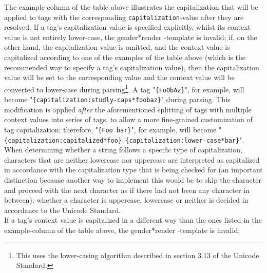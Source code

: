 \documentclass{article}
\newcommand{\GenderRender}{
    gender*render
}
\begin{document}
    The example-column of the table above illustrates the capitalization that will be applied to tags with the corresponding \texttt{capitalization}-value after they are resolved.
    If a tag's capitalization value is specified explicitly, whilst its context value is not entirely lower-case, the \GenderRender-template is invalid;
    if, on the other hand, the capitalization value is omitted, and the context value is capitalized according to one of the examples of the table above (which is the recommended way to specify a tag's capitalization value), then the capitalization value will be set to the corresponding value and the context value will be converted to lower-case during parsing\footnote{This uses the lower-casing algorithm described in section 3.13 of the Unicode Standard.}.
    A tag "\texttt{\{FoObAz\}}", for example, will become "\texttt{\{capitalization:studly-caps*foobaz\}}" during parsing.
    This modification is applied \emph{after} the aforementioned splitting of tags with multiple context values into series of tags, to allow a more fine-grained customization of tag capitalization;
    therefore, "\texttt{\{Foo bar\}}", for example, will become "\texttt{\{capitalization:capitalized*foo\} \{capitalization:lower-case*bar\}}".
    When determining whether a string follows a specific type of capitalization, characters that are neither lowercase nor uppercase are interpreted as capitalized in accordance with the capitalization type that is being checked for (an important distinction because another way to implement this would be to skip the character and proceed with the next character as if there had not been any character in between);
    whether a character is uppercase, lowercase or neither is decided in accordance to the Unicode Standard.\\
    If a tag's context value is capitalized in a different way than the ones listed in the example-column of the table above, the \GenderRender-template is invalid;
\end{document}
